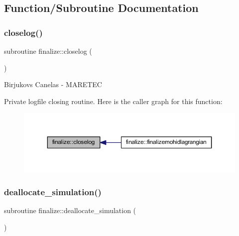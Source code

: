 \subsection{Function/\+Subroutine Documentation}
\mbox{\label{namespacefinalize_ac448631d05fe5daa8739f32c95e89152}} 
\subsubsection{\texorpdfstring{closelog()}{closelog()}}
{\footnotesize\ttfamily subroutine finalize\+::closelog (\begin{DoxyParamCaption}{ }\end{DoxyParamCaption})\hspace{0.3cm}{\ttfamily [private]}}



Birjukovs Canelas -\/ M\+A\+R\+E\+T\+EC 

Private logfile closing routine. Here is the caller graph for this function\+:
\nopagebreak
\begin{figure}[H]
\begin{center}
\leavevmode
\includegraphics[width=350pt]{namespacefinalize_ac448631d05fe5daa8739f32c95e89152_icgraph}
\end{center}
\end{figure}
\mbox{\label{namespacefinalize_a2b6733e6db5a768ac96ad9274685ad43}} 
\subsubsection{\texorpdfstring{deallocate\+\_\+simulation()}{deallocate\_simulation()}}
{\footnotesize\ttfamily subroutine finalize\+::deallocate\+\_\+simulation (\begin{DoxyParamCaption}{ }\end{DoxyParamCaption})\hspace{0.3cm}{\ttfamily [private]}}



